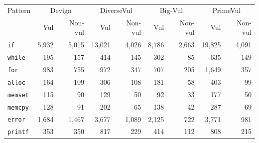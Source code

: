 \begin{tabular}{lrrrrrrrr}
\toprule
Pattern & \multicolumn{2}{c}{Devign} & \multicolumn{2}{c}{DiverseVul} & \multicolumn{2}{c}{Big-Vul} & \multicolumn{2}{c}{PrimeVul} \\
 & Vul & Non-vul & Vul & Non-vul & Vul & Non-vul & Vul & Non-vul \\
\midrule
\texttt{if} & 5,932 & 5,015 & 13,021 & 4,026 & 8,786 & 2,663 & 19,825 & 4,091 \\
\texttt{while} & 195 & 157 & 414 & 145 & 302 & 85 & 635 & 149 \\
\texttt{for} & 983 & 755 & 972 & 347 & 707 & 205 & 1,649 & 357 \\
\texttt{alloc} & 164 & 109 & 306 & 108 & 181 & 58 & 403 & 99 \\
\texttt{memset} & 115 & 90 & 129 & 50 & 92 & 33 & 177 & 50 \\
\texttt{memcpy} & 128 & 91 & 202 & 65 & 138 & 42 & 287 & 69 \\
\texttt{error} & 1,684 & 1,467 & 3,677 & 1,089 & 2,125 & 722 & 3,771 & 981 \\
\texttt{printf} & 353 & 350 & 817 & 229 & 414 & 112 & 808 & 215 \\
\bottomrule
\end{tabular}

